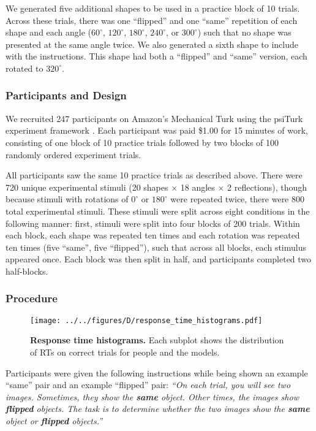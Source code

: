 \documentclass[10pt,letterpaper]{article}
\begin{document}
We generated five additional shapes to be used in a practice block of
10 trials. Across these trials, there was one ``flipped'' and one
``same'' repetition of each shape and each angle ($60^\circ$,
$120^\circ$, $180^\circ$, $240^\circ$, or $300^\circ$) such that no
shape was presented at the same angle twice. We also generated a sixth
shape to include with the instructions.  This shape had both a
``flipped'' and ``same'' version, each rotated to $320^\circ$.


\subsubsection{Participants and Design}

We recruited 247 participants on Amazon's Mechanical Turk using the
psiTurk experiment framework \cite{McDonnell12}. Each participant was
paid \$1.00 for 15 minutes of work, consisting of one block of 10
practice trials followed by two blocks of 100 randomly ordered
experiment trials.

All participants saw the same 10 practice trials as described
above. There were 720 unique experimental stimuli (20 shapes $\times$
18 angles $\times$ 2 reflections), though because stimuli with
rotations of $0^\circ$ or $180^\circ$ were repeated twice, there were
800 total experimental stimuli. These stimuli were split across eight
conditions in the following manner: first, stimuli were split into
four blocks of 200 trials. Within each block, each shape was repeated
ten times and each rotation was repeated ten times (five ``same'',
five ``flipped''), such that across all blocks, each stimulus appeared
once. Each block was then split in half, and participants completed
two half-blocks.

\subsubsection{Procedure}

\begin{figure*}[t]
  \begin{center}
    \texttt{[image: ../../figures/D/response\_time\_histograms.pdf]}
    \caption{\textbf{Response time histograms.} Each subplot shows the
      distribution of RTs on correct trials for people and the
      models.}
    \label{fig:histograms}
  \end{center}
\end{figure*}

Participants were given the following instructions while being shown
an example ``same'' pair and an example ``flipped'' pair: \textit{``On
  each trial, you will see two images. Sometimes, they show the
  \textbf{same} object. Other times, the images show \textbf{flipped}
  objects. The task is to determine whether the two images show the
  \textbf{same} object or \textbf{flipped} objects.''}
\end{document}
